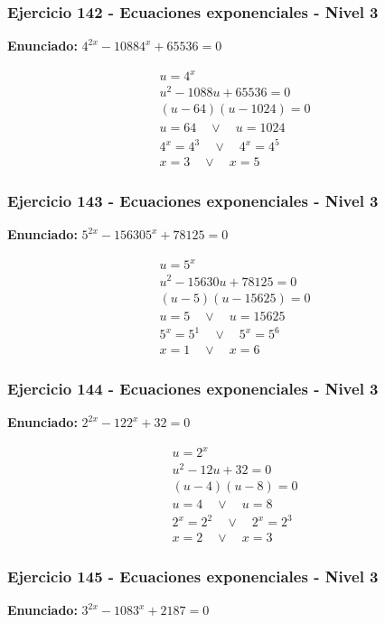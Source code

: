 \documentclass[12pt,a4paper]{article}
\begin{document}
\subsubsection*{Ejercicio 142 - Ecuaciones exponenciales - Nivel 3}
\textbf{Enunciado:} \(4^{2x}-10884^x+65536=0\)

\[
\begin{aligned}
u=4^x\\
u^2-1088u+65536=0\\
(u-64)(u-1024)=0\\
u=64\quad \vee\quad u=1024\\
4^x=4^{3}\quad \vee\quad 4^x=4^{5}\\
\boxed{x=3\quad \vee\quad x=5}
\end{aligned}
\]


\subsubsection*{Ejercicio 143 - Ecuaciones exponenciales - Nivel 3}
\textbf{Enunciado:} \(5^{2x}-156305^x+78125=0\)

\[
\begin{aligned}
u=5^x\\
u^2-15630u+78125=0\\
(u-5)(u-15625)=0\\
u=5\quad \vee\quad u=15625\\
5^x=5^{1}\quad \vee\quad 5^x=5^{6}\\
\boxed{x=1\quad \vee\quad x=6}
\end{aligned}
\]


\subsubsection*{Ejercicio 144 - Ecuaciones exponenciales - Nivel 3}
\textbf{Enunciado:} \(2^{2x}-122^x+32=0\)

\[
\begin{aligned}
u=2^x\\
u^2-12u+32=0\\
(u-4)(u-8)=0\\
u=4\quad \vee\quad u=8\\
2^x=2^{2}\quad \vee\quad 2^x=2^{3}\\
\boxed{x=2\quad \vee\quad x=3}
\end{aligned}
\]


\subsubsection*{Ejercicio 145 - Ecuaciones exponenciales - Nivel 3}
\textbf{Enunciado:} \(3^{2x}-1083^x+2187=0\)
\end{document}
